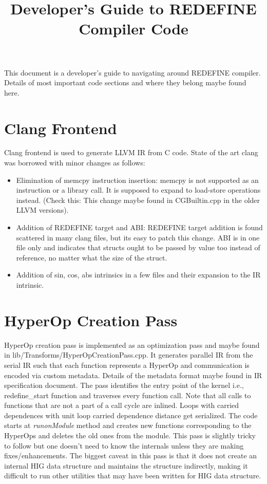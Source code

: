\documentclass[12pt]{article}
\begin{document}
\title{Developer's Guide to REDEFINE Compiler Code}
\maketitle
This document is a developer's guide to navigating around REDEFINE compiler. Details of most important code sections and where they belong maybe found here.

\section{Clang Frontend}
Clang frontend is used to generate LLVM IR from C code. State of the art clang was borrowed with minor changes as follows:
\begin{itemize}
 \item Elimination of memcpy instruction insertion: memcpy is not supported as an instruction or a library call. It is supposed to expand to load-store operations instead. (Check this: This change maybe found in CGBuiltin.cpp in the older LLVM versions).
 \item Addition of REDEFINE target and ABI: REDEFINE target addition is found scattered in many clang files, but its easy to patch this change. ABI is in one file only and indicates that structs ought to be passed by value too instead of reference, no matter what the size of the struct.
 \item Addition of sin, cos, abs intrinsics in a few files and their expansion to the IR intrinsic.
\end{itemize}

\section{HyperOp Creation Pass}
HyperOp creation pass is implemented as an optimization pass and maybe found in lib/Transforms/HyperOpCreationPass.cpp.
It generates parallel IR from the serial IR such that each function represents a HyperOp and communication is encoded via custom metadata. Details of the metadata format maybe found in IR specification document. The pass identifies the entry point of the kernel i.e., redefine\_start function and traverses every function call. Note that all calls to functions that are not a part of a call cycle are inlined. Loops with carried dependences with unit loop carried dependence distance get serialized. The code starts at \textit{runonModule} method and creates new functions corresponding to the HyperOps and deletes the old ones from the module. This pass is slightly tricky to follow but one doesn't need to know the internals unless they are making fixes/enhancements. The biggest caveat in this pass is that it does not create an internal HIG data structure and maintains the structure indirectly, making it difficult to run other utilities that may have been written for HIG data structure.
\end{document}
